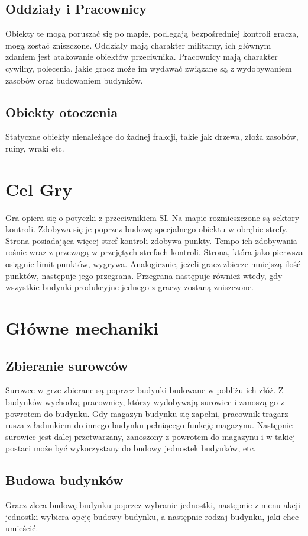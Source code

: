 \documentclass[a4paper]{scrreprt}
\begin{document}
\subsection{Oddziały i Pracownicy}
Obiekty te mogą poruszać się po mapie, podlegają bezpośredniej kontroli gracza, mogą zostać zniszczone. Oddziały mają charakter militarny, ich głównym zdaniem jest atakowanie obiektów przeciwnika. Pracownicy mają charakter cywilny, polecenia, jakie gracz może im wydawać związane są z wydobywaniem zasobów oraz budowaniem budynków.
\subsection{Obiekty otoczenia}
Statyczne obiekty nienależące do żadnej frakcji, takie jak drzewa, złoża zasobów, ruiny, wraki etc. 

\section{Cel Gry}
Gra opiera się o potyczki z przeciwnikiem SI. Na mapie rozmieszczone są sektory kontroli. Zdobywa się je poprzez budowę specjalnego obiektu w obrębie strefy. Strona posiadająca więcej stref kontroli zdobywa punkty. Tempo ich zdobywania rośnie wraz z przewagą w przejętych strefach kontroli. Strona, która jako pierwsza osiągnie limit punktów, wygrywa. Analogicznie, jeżeli gracz zbierze mniejszą ilość punktów, następuje jego przegrana. Przegrana następuje również wtedy, gdy wszystkie budynki produkcyjne jednego z graczy zostaną zniszczone.
\section{Główne mechaniki}
\subsection{Zbieranie surowców}
Surowce w grze zbierane są poprzez budynki budowane w pobliżu ich złóż. Z budynków wychodzą pracownicy, którzy wydobywają surowiec i zanoszą go z powrotem do budynku. Gdy magazyn budynku się zapełni, pracownik  tragarz rusza z ładunkiem do innego budynku pełniącego funkcję magazynu. Następnie surowiec jest dalej przetwarzany, zanoszony z powrotem do magazynu i w takiej postaci może być wykorzystany do budowy jednostek budynków, etc.
\subsection{Budowa budynków} 
Gracz zleca budowę budynku poprzez wybranie jednostki, następnie z menu akcji jednostki wybiera opcję budowy budynku, a następnie rodzaj budynku, jaki chce umieścić. 
\end{document}
